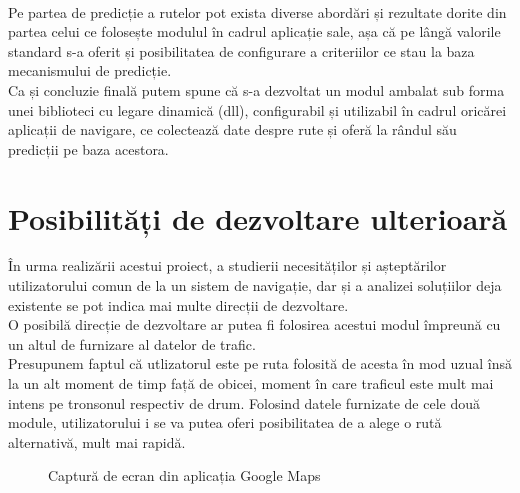 \vspace{6pt}
\\Pe partea de predicție a rutelor pot exista diverse abordări și rezultate dorite din partea celui ce folosește modulul în cadrul aplicație sale, așa că pe lângă valorile standard s-a oferit și posibilitatea de configurare a criteriilor ce stau la baza mecanismului de predicție.
\vspace{6pt}
\\Ca și concluzie finală putem spune că s-a dezvoltat un modul ambalat sub forma unei biblioteci cu legare dinamică (\acrshort{dll}), configurabil și utilizabil în cadrul oricărei aplicații de navigare, ce colectează date despre rute și oferă la rândul său predicții pe baza acestora.

\section{Posibilități de dezvoltare ulterioară} 
În urma realizării acestui proiect, a studierii necesităților și așteptărilor utilizatorului comun de la un sistem de navigație, dar și a analizei soluțiilor deja existente se pot indica mai multe direcții de dezvoltare.
\vspace{6pt}
\\O posibilă direcție de dezvoltare ar putea fi folosirea acestui modul împreună cu un altul de furnizare al datelor de trafic.
\vspace{6pt}
\\Presupunem faptul că utlizatorul este pe ruta folosită de acesta în mod uzual însă la un alt moment de timp față de obicei, moment în care traficul este mult mai intens pe tronsonul respectiv de drum.
Folosind datele furnizate de cele două module, utilizatorului i se va putea oferi posibilitatea de a alege o rută alternativă, mult mai rapidă.

\begin{figure}[h!]
  \centering
  \caption{Captură de ecran din aplicația Google Maps}
  \end{figure}	
  
